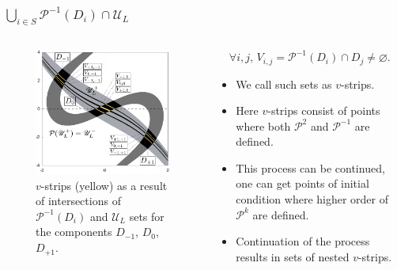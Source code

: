 \documentclass [10pt] {beamer}
\begin{document}
\begin{frame}
	\frametitle{$\bigcup_{i \in S} \mathcal{P}^{-1}(D_i) \cap \mathscr{U}_L$}
	\begin{columns}[T]
		\begin{column}{.5\textwidth}
			\begin{figure}
			\includegraphics[width = 1\textwidth]{pic/v-strips-last-step.pdf}
			\caption{$v$-strips (yellow) as a result of intersections of $\mathcal{P}^{-1}(D_i)$ and $\mathscr{U}_L$ sets for the components $D_{-1}$, $D_0$, $D_{+1}$.}
			\label{pic:v-strips-last-step}
			\end{figure}
		\end{column}
		\begin{column}{.5\textwidth}
			\begin{equation*}
				\forall i, j, \, V_{i, j} = \mathcal{P}^{-1}(D_i) \cap D_j \neq \varnothing.
			\end{equation*}
			\begin{itemize}
				\item We call such sets as $v$-strips.\\[10pt]
				\item Here $v$-strips consist of points where both $\mathcal{P}^2$ and $\mathcal{P}^{-1}$ are defined.\\[10pt]
				\item This process can be continued, one can get points of initial condition where higher order of $\mathcal{P}^{k}$ are defined.\\[10pt]
				\item Continuation of the process results in sets of nested $v$-strips.\\[10pt]
			\end{itemize}
		\end{column}
	\end{columns}
\end{frame}
\end{document}
